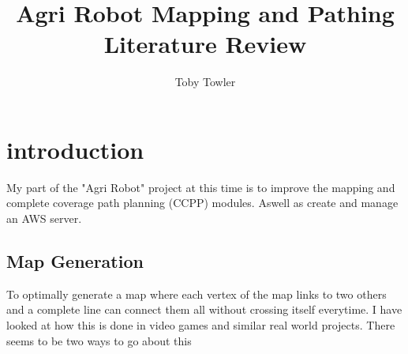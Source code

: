 \documentclass[review]{cmpreport}
\title{Agri Robot Mapping and Pathing Literature Review}
\author{Toby Towler}
\begin{document}
\section{introduction}

My part of the "Agri Robot" project at this time is to improve the mapping and complete coverage path planning (CCPP) modules. Aswell as create and manage an AWS server.
\subsection{Map Generation}
To optimally generate a map where each vertex of the map links to two others and a complete line can connect them all without crossing itself everytime. I have looked at how this is done in video games and similar real world projects. There seems to be two ways to go about this
\end{document}
